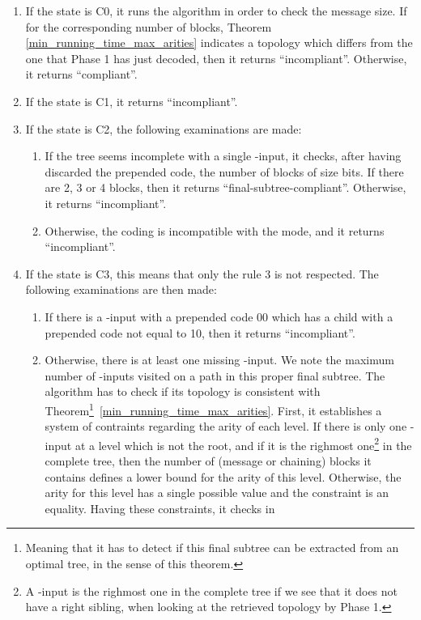 \documentclass{llncs}
\begin{document}
\begin{enumerate}
\item If the state is C0, it runs the  algorithm in order to check the message size. If for the corresponding number  of blocks, 
 Theorem \ref{min_running_time_max_arities} indicates a topology which differs from
 the one that Phase 1 has just decoded, then it returns ``incompliant''. Otherwise, it returns ``compliant''.

\item If the state is C1, it returns ``incompliant''.
 \item If the state is C2, the following examinations are made:
 \begin{enumerate}
  \item If the tree seems incomplete with a single -input, it checks, after having discarded the prepended code, the number of blocks of size  bits.
  If there are 2, 3 or 4 blocks, then it returns ``final-subtree-compliant''. Otherwise, it returns ``incompliant''.
  \item Otherwise, the coding is incompatible with the mode, and it returns ``incompliant''.
 \end{enumerate}
 \item If the state is C3, this means that only the rule 3 is not respected. The following examinations are then made:
 \begin{enumerate}
  \item If there is a -input with a prepended code 00 which has a child with a prepended code not equal to 10, then it returns ``incompliant''.
\item Otherwise, there is at least one missing -input. We note  the maximum number of -inputs visited on a path in this proper final subtree. 
The algorithm has to check if its topology is consistent with Theorem\footnote{Meaning that it has to detect if this final subtree can be extracted 
  from an optimal tree, in the sense of this theorem.}~\ref{min_running_time_max_arities}. 
  First, it establishes a system of contraints regarding the arity of each level.  If there is only one -input at a level which is not the root, 
  and if it is the righmost one\footnote{A -input is the righmost one in the complete tree if we see that it does not have a right sibling, when looking at the 
  retrieved topology by Phase 1.} in the complete tree, then the number of (message or chaining) blocks it contains defines a lower bound for the arity 
  of this level. Otherwise, the arity for this level has a single possible value and the constraint is an equality. Having these  constraints, it checks in 

\end{enumerate}
\end{enumerate}
\end{document}

